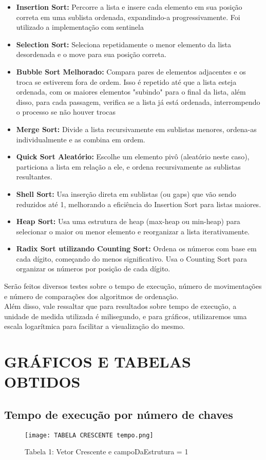 \documentclass[a4paper, 12pt]{article}
\begin{document}
\begin{itemize}
    \item \textbf{Insertion Sort:} Percorre a lista e insere cada elemento em sua posição correta em uma sublista ordenada, expandindo-a progressivamente. Foi utilizado a implementação com sentinela
    \item \textbf{Selection Sort:} Seleciona repetidamente o menor elemento da lista desordenada e o move para sua posição correta.
    \item \textbf{Bubble Sort Melhorado:} Compara pares de elementos adjacentes e os troca se estiverem fora de ordem. Isso é repetido até que a lista esteja ordenada, com os maiores elementos "subindo" para o final da lista, além disso, para cada passagem, verifica se a lista já está ordenada, interrompendo o processo se não houver trocas
    \item \textbf{Merge Sort:} Divide a lista recursivamente em sublistas menores, ordena-as individualmente e as combina em ordem.
    \item \textbf{Quick Sort Aleatório:} Escolhe um elemento pivô (aleatório neste caso), particiona a lista em relação a ele, e ordena recursivamente as sublistas resultantes.
    \item \textbf{Shell Sort:} Usa inserção direta em sublistas (ou gaps) que vão sendo reduzidos até 1, melhorando a eficiência do Insertion Sort para listas maiores.
    \item \textbf{Heap Sort:} Usa uma estrutura de heap (max-heap ou min-heap) para selecionar o maior ou menor elemento e reorganizar a lista iterativamente.
    \item \textbf{Radix Sort utilizando Counting Sort:} Ordena os números com base em cada dígito, começando do menos significativo. Usa o Counting Sort para organizar os números por posição de cada dígito.
\end{itemize}
Serão feitos diversos testes sobre o tempo de execução, número de movimentações e número de comparações dos algoritmos de ordenação. \\
Além disso, vale ressaltar que para resultados sobre tempo de execução, a unidade de medida utilizada é milisegundo, e para gráficos, utilizaremos uma escala logarítmica para facilitar a visualização do mesmo.
\section{GRÁFICOS E TABELAS OBTIDOS}
\subsection{Tempo de execução por número de chaves}
\begin{figure}[H] %
    \centering
    \texttt{[image: TABELA CRESCENTE tempo.png]}
    \captionsetup{labelformat=empty} %
    \caption{Tabela 1: Vetor Crescente e campoDaEstrutura = 1}
    \label{fig:exemplo}
\end{figure}
\end{document}
